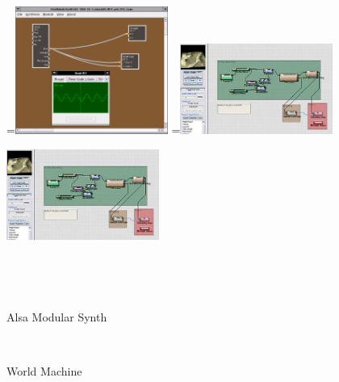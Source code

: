 \documentclass{article}
\begin{document}
\begin{figure}[ht] 
  =\hbox{\includegraphics[width=5cm]{alsa-modular-synth}}%
  =\hbox{\includegraphics[width=5cm]{world-machine}}%
  {\,}
  \hfill 
  \begin{minipage}{5cm}
    \centering
  \end{minipage}
  \hfill
  \begin{minipage}{5cm}
    \centering
    \includegraphics[width=5cm]{world-machine}
  \end{minipage}
  \hfill
  {\,}
  
  
  {\,}
  \hfill 
  \begin{minipage}{5cm}
    \centering
    \caption{Alsa Modular Synth\cite{alsa-modular-synth}}
    \label{fig:alsa-modular-synth}
  \end{minipage}
  \hfill
  \begin{minipage}{5cm}
    \centering
    \caption{World Machine\cite{world-machine}}
    \label{fig:world-machine}
  \end{minipage}
  \hfill
  {\,} 
  

\end{figure}
\end{document}
